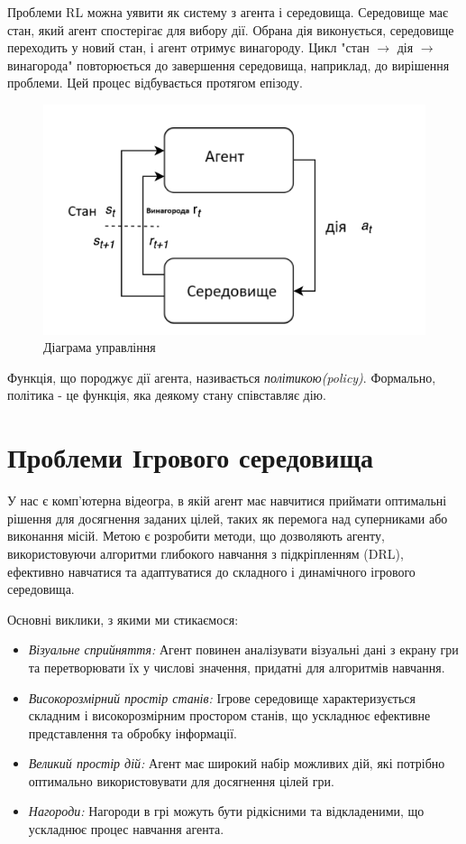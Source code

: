  Проблеми RL можна уявити як систему з агента і середовища. Середовище має стан, який агент 
 спостерігає для вибору дії. Обрана дія виконується, середовище переходить у новий стан, і агент
  отримує винагороду. Цикл "стан $\rightarrow$ дія $\rightarrow$ винагорода" повторюється до завершення середовища, наприклад,
   до вирішення проблеми. Цей процес відбувається протягом епізоду.
\begin{figure}[h]
  \centering
  \includegraphics[scale=1]{Pictures/RL_Diagram.png}
  \caption{Діаграма управління}
  \label{fig:RLloopdiagram}
\end{figure}
\newpage
Функція, що породжує дії агента, називається {\em політикою(policy)}. Формально, 
політика - це функція, яка деякому стану співставляє дію.

\section{Проблеми Ігрового середовища}
  \setcounter{equation}{0}
 \setcounter{theorem}{0}

 У нас є комп'ютерна відеогра, в якій агент має навчитися приймати оптимальні рішення для досягнення заданих цілей, таких як перемога над суперниками або виконання місій. Метою є розробити методи, що дозволяють агенту, використовуючи алгоритми глибокого навчання з підкріпленням (DRL), ефективно навчатися та адаптуватися до складного і динаміч\-ного ігрового середовища.

 Основні виклики, з якими ми стикаємося:
 
 \begin{itemize}
   \item \emph{Візуальне сприйняття:} Агент повинен аналізувати візуальні дані з екрану гри та перетворювати їх у числові значення, придатні для алгоритмів навчання.
   \item \emph{Високорозмірний простір станів:} Ігрове середовище характеризується складним і високорозмірним простором станів, що ускладнює ефективне представлення та обробку інформації.
   \item \emph{Великий простір дій:} Агент має широкий набір можливих дій, які потрібно оптимально використовувати для досягнення цілей гри.
   \item \emph{Нагороди:} Нагороди в грі можуть бути рідкісними та відкладеними, що ускладнює процес навчання агента.
 \end{itemize}